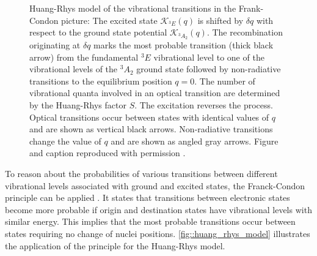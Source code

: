    \begin{figure}[htbp]
     \centering
     \caption[Huang-Rhys model of vibrational transitions]{Huang-Rhys model of the vibrational transitions in the Frank-Condon picture: The excited state $\mathcal{K}_{{}^{3}E}(q)$ is shifted by $\delta q$ with respect to the ground state potential $\mathcal{K}_{{}^{3}A_{2}}(q)$. The recombination originating at $\delta q$ marks the most probable transition (thick black arrow) from the fundamental ${}^{3}E$ vibrational level to one of the vibrational levels of the ${}^{3}A_{2}$ ground state followed by non-radiative transitions to the equilibrium position $q = 0$. The number of vibrational quanta involved in an optical transition are determined by the Huang-Rhys factor $S$. The excitation reverses the process. Optical transitions occur between states with identical values of $q$ and are shown as vertical black arrows. Non-radiative transitions change the value of $q$ and are shown as angled gray arrows. Figure and caption reproduced with permission \cite{Riedrich-moller2014}.}
     \label{fig::huang_rhys_model}
   \end{figure}

   To reason about the probabilities of various transitions between different vibrational levels associated with ground and excited states, the Franck-Condon principle can be applied \cite{condon1947franck}. It states that transitions between electronic states become more probable if origin and destination states have vibrational levels with similar energy. This implies that the most probable transitions occur between states requiring no change of nuclei positions. \autoref{fig::huang_rhys_model} illustrates the application of the principle for the Huang-Rhys model.

